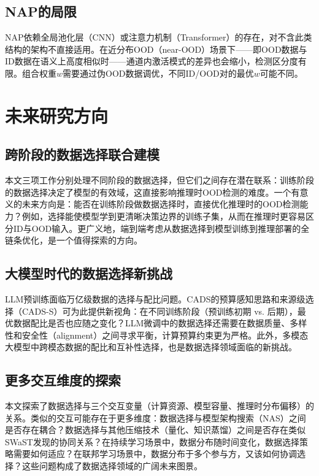 \subsection{NAP的局限}

NAP依赖全局池化层（CNN）或注意力机制（Transformer）的存在，对不含此类结构的架构不直接适用。在近分布OOD（near-OOD）场景下——即OOD数据与ID数据在语义上高度相似时——通道内激活模式的差异也会缩小，检测区分度有限。组合权重$w$需要通过伪OOD数据调优，不同ID/OOD对的最优$w$可能不同。%


\section{未来研究方向}

\subsection{跨阶段的数据选择联合建模}

本文三项工作分别处理不同阶段的数据选择，但它们之间存在潜在联系：训练阶段的数据选择决定了模型的有效域，这直接影响推理时OOD检测的难度。一个有意义的未来方向是：能否在训练阶段做数据选择时，直接优化推理时的OOD检测能力？例如，选择能使模型学到更清晰决策边界的训练子集，从而在推理时更容易区分ID与OOD输入。更广义地，端到端考虑从数据选择到模型训练到推理部署的全链条优化，是一个值得探索的方向。

\subsection{大模型时代的数据选择新挑战}

LLM预训练面临万亿级数据的选择与配比问题\cite{albalak2024survey}。CADS的预算感知思路和来源级选择（CADS-S）可为此提供新视角：在不同训练阶段（预训练初期 vs. 后期），最优数据配比是否也应随之变化？LLM微调中的数据选择\cite{zhou2023lima}还需要在数据质量、多样性和安全性（alignment）之间寻求平衡，计算预算约束更为严格。此外，多模态大模型中跨模态数据的配比和互补性选择，也是数据选择领域面临的新挑战。

\subsection{更多交互维度的探索}

本文探索了数据选择与三个交互变量（计算资源、模型容量、推理时分布偏移）的关系。类似的交互可能存在于更多维度：数据选择与模型架构搜索（NAS\cite{liu2018darts}）之间是否存在耦合？数据选择与其他压缩技术（量化\cite{han2016deep}、知识蒸馏）之间是否存在类似SWaST发现的协同关系？在持续学习场景中，数据分布随时间变化\cite{borsos2020coresets}，数据选择策略需要如何适应？在联邦学习场景中，数据分布于多个参与方，又该如何协调选择？这些问题构成了数据选择领域的广阔未来图景。
